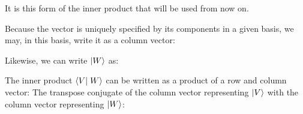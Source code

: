 It is this form of the inner product that will be used from now on.

Because the vector is uniquely specified by its components in a given basis, we may, in this basis, write it as a column vector:

Likewise, we can write $\left| W \right>$ as:


The inner product $\braket{V}{W}$ can be written as a product of a row and column vector: The transpose conjugate of the column vector representing $\left| V \right>$ with the column vector representing $\left| W \right>$:


\newpage